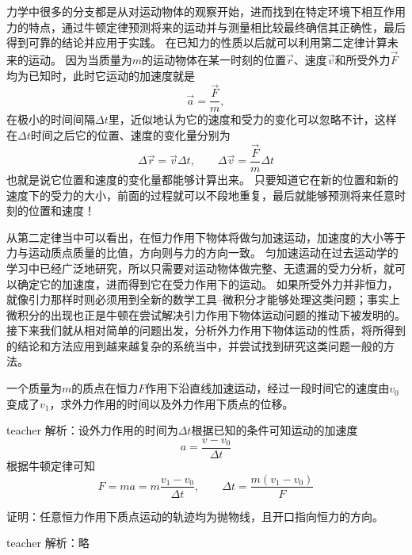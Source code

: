 力学中很多的分支都是从对运动物体的观察开始，进而找到在特定环境下相互作用力的特点，通过牛顿定律预测将来的运动并与测量相比较最终确信其正确性，最后得到可靠的结论并应用于实践。
在已知力的性质以后就可以利用第二定律计算未来的运动。
因为当质量为$m$的运动物体在某一时刻的位置$\vec{r}$、速度$\vec{v}$和所受外力$\vec{F}$均为已知时，此时它运动的加速度就是
\begin{equation}
\vec{a} = \frac{\vec{F}}{m},
\end{equation}
在极小的时间间隔$ \Delta t$里，近似地认为它的速度和受力的变化可以忽略不计，这样在$ \Delta t$时间之后它的位置、速度的变化量分别为
\begin{equation}
\Delta \vec{r} = \vec{v} \Delta t,\qquad \Delta \vec{v}  = \frac{\vec{F}}{m} \Delta t
\end{equation}
也就是说它位置和速度的变化量都能够计算出来。
只要知道它在新的位置和新的速度下的受力的大小，前面的过程就可以不段地重复，最后就能够预测将来任意时刻的位置和速度！

从第二定律当中可以看出，在恒力作用下物体将做匀加速运动，加速度的大小等于力与运动质点质量的比值，方向则与力的方向一致。
匀加速运动在过去运动学的学习中已经广泛地研究，所以只需要对运动物体做完整、无遗漏的受力分析，就可以确定它的加速度，进而得到它在受力作用下的运动。
如果所受外力并非恒力，就像引力那样时则必须用到全新的数学工具--微积分才能够处理这类问题；事实上微积分的出现也正是牛顿在尝试解决引力作用下物体运动问题的推动下被发明的。
接下来我们就从相对简单的问题出发，分析外力作用下物体运动的性质，将所得到的结论和方法应用到越来越复杂的系统当中，并尝试找到研究这类问题一般的方法。






\begin{example}

一个质量为$m$的质点在恒力$F$作用下沿直线加速运动，经过一段时间它的速度由$v_0$变成了$v_1$，求外力作用的时间以及外力作用下质点的位移。
\begin{taggedblock}{teacher}
\newline
解析：设外力作用的时间为$\Delta t$根据已知的条件可知运动的加速度
\[
a = \frac{v-v_0}{\Delta t}
\]
根据牛顿定律可知
\[  F = ma = m\frac{v_1-v_0}{\Delta t},\qquad \Delta t = \frac{m(v_1-v_0)}{F}\]
\end{taggedblock}
\end{example}



\begin{example}

证明：任意恒力作用下质点运动的轨迹均为抛物线，且开口指向恒力的方向。
\begin{taggedblock}{teacher}
\newline
解析：略
\end{taggedblock}
\end{example}


